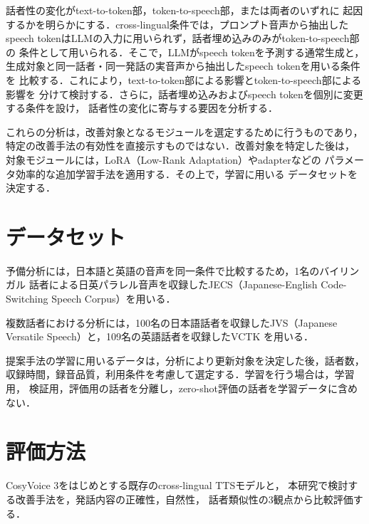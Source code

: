 \documentclass[twocolumn, a4paper]{UECIEresume}
\begin{document}
話者性の変化がtext-to-token部，token-to-speech部，または両者のいずれに
起因するかを明らかにする．cross-lingual条件では，プロンプト音声から抽出した
speech tokenはLLMの入力に用いられず，話者埋め込みのみがtoken-to-speech部の
条件として用いられる．そこで，LLMがspeech tokenを予測する通常生成と，
生成対象と同一話者・同一発話の実音声から抽出したspeech tokenを用いる条件を
比較する．これにより，text-to-token部による影響とtoken-to-speech部による影響を
分けて検討する．さらに，話者埋め込みおよびspeech tokenを個別に変更する条件を設け，
話者性の変化に寄与する要因を分析する．

これらの分析は，改善対象となるモジュールを選定するために行うものであり，
特定の改善手法の有効性を直接示すものではない．改善対象を特定した後は，
対象モジュールには，LoRA（Low-Rank Adaptation）やadapterなどの
パラメータ効率的な追加学習手法を適用する．その上で，学習に用いる
データセットを決定する．

\section{データセット}

予備分析には，日本語と英語の音声を同一条件で比較するため，1名のバイリンガル
話者による日英パラレル音声を収録したJECS（Japanese-English Code-Switching
Speech Corpus）\cite{JECS}を用いる．

複数話者における分析には，100名の日本語話者を収録したJVS（Japanese Versatile
Speech）\cite{Takamichi2019JVS}と，109名の英語話者を収録したVCTK
\cite{VeauxVCTK}を用いる．

提案手法の学習に用いるデータは，分析により更新対象を決定した後，話者数，
収録時間，録音品質，利用条件を考慮して選定する．学習を行う場合は，学習用，
検証用，評価用の話者を分離し，zero-shot評価の話者を学習データに含めない．

% 
% 

\section{評価方法}

CosyVoice 3をはじめとする既存のcross-lingual TTSモデルと，
本研究で検討する改善手法を，発話内容の正確性，自然性，
話者類似性の3観点から比較評価する．
\end{document}
